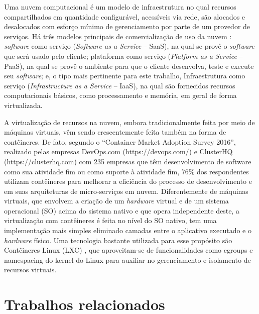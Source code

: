\documentclass[conference]{IEEEtran}
\begin{document}
Uma nuvem computacional é um modelo de infraestrutura no qual recursos compartilhados em quantidade configurável, acessíveis via rede, são alocados e desalocados com esforço mínimo de gerenciamento por parte de um provedor de serviços. \cite{NIST2011}
%
Há três modelos principais de comercialização de uso da nuvem \cite{NIST2011}: \textit{software} como serviço (\textit{Software as a Service} -- SaaS), na qual se provê o \textit{software} que será usado pelo cliente; plataforma como serviço (\textit{Platform as a Service} -- PaaS), na qual se provê o ambiente para que o cliente desenvolva, teste e execute seu \textit{software}; e, o tipo mais pertinente para este trabalho, Infraestrutura como serviço (\textit{Infrastructure as a Service} -- IaaS), na qual são fornecidos recursos computacionais básicos, como processamento e memória, em geral de forma virtualizada.


A virtualização de recursos na nuvem, embora tradicionalmente feita por meio de máquinas virtuais, vêm sendo crescentemente feita também na forma de contêineres.
%
De fato, segundo o ``Container Market Adoption Survey 2016'', realizado pelas empresas DevOps.com (https://devops.com/) e ClusterHQ (https://clusterhq.com) com 235 empresas que têm desenvolvimento de software como sua atividade fim ou como suporte à atividade fim, 76\% dos respondentes utilizam contêineres para melhorar a eficiência do processo de desenvolvimento e em suas arquiteturas de micro-serviços em nuvem.
%
Diferentemente de máquinas virtuais, que envolvem a criação de um \textit{hardware} virtual e de um sistema operacional (SO) acima do sistema nativo e que opera independente deste, a virtualização com contêineres é feita no nível do SO nativo, tem uma implementação mais simples eliminado camadas entre o aplicativo executado e o \textit{hardware} físico.
%
Uma tecnologia bastante utilizada para esse propósito são Contêineres Linux (LXC) \cite{Linuxcontainers.org2015}, que aproveitam-se de funcionalidades como cgroups e namespacing do kernel do Linux para auxiliar no gerenciamento e isolamento de recursos virtuais.



\section{Trabalhos relacionados}
\label{sec:related}
\end{document}
